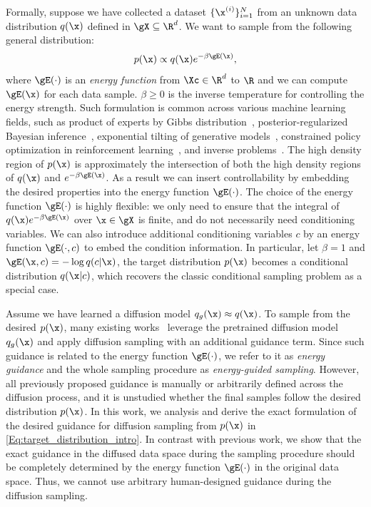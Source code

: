 Formally, suppose we have collected a dataset $\{\x^{(i)}\}_{i=1}^N$ from an unknown data distribution $q(\x)$ defined in $\gX\subseteq \R^d$. We want to sample from the following general distribution:
\begin{equation}
\label{Eq:target_distribution_intro}
    p(\x) \propto q(\x)e^{-\beta\gE(\x)},
\end{equation}
where $\gE(\cdot)$ is an \textit{energy function} from $\Xc\in \R^d$ to $\R$ and we can compute $\gE(\x)$ for each data sample. $\beta \geq 0$ is the inverse temperature for controlling the energy strength. 
Such formulation is common across various machine learning fields, such as product of experts by Gibbs distribution~\citep{hinton2002training}, posterior-regularized Bayesian inference~\citep{zhu2014bayesian}, exponential tilting of generative models~\citep{xiao2020exponential}, constrained policy optimization in reinforcement learning~\citep{awr,ziegler2019fine}, and inverse problems~\citep{chung2022diffusion}. 
The high density region of $p(\x)$ is approximately the intersection of both the high density regions of $q(\x)$ and $e^{-\beta\gE(\x)}$. As a result we can insert controllability by embedding the desired properties into the energy function $\gE(\cdot)$. 
The choice of the energy function $\gE(\cdot)$ is highly flexible: we only need to ensure that the integral of $q(\x)e^{-\beta\gE(\x)}$ over $\x\in\gX$ is finite, and do not necessarily need conditioning variables. 
We can also introduce additional conditioning variables $c$ by an energy function $\gE(\cdot, c)$ to embed the condition information.
In particular, let $\beta=1$ and $\gE(\x,c) = -\log q(c|\x)$, the target distribution $p(\x)$ becomes a conditional distribution $q(\x|c)$, which recovers the classic conditional sampling problem as a special case.











Assume we have learned a diffusion model $q_g(\x) \approx q(\x)$. To sample from the desired $p(\x)$, many existing works~\citep{diffuser, zhao2022egsde, bao2022equivariant,zhong2022deep,ho2022video,chung2022diffusion,kawar2022denoising} leverage the pretrained diffusion model $q_g(\x)$ and apply diffusion sampling with an additional guidance term.
Since such guidance is related to the energy function $\gE(\cdot)$, we refer to it as \textit{energy guidance} and the whole sampling procedure as \textit{energy-guided sampling}.
However, all previously proposed guidance is manually or arbitrarily defined across the diffusion process, and it is unstudied whether the final samples follow the desired distribution $p(\x)$.
In this work, we analysis and derive the exact formulation of the desired guidance for diffusion sampling from $p(\x)$ in \eqref{Eq:target_distribution_intro}. In contrast with previous work, we show that the exact guidance in the diffused data space during the sampling procedure should be completely determined by the energy function $\gE(\cdot)$ in the original data space. Thus, we cannot use arbitrary human-designed guidance during the diffusion sampling.



